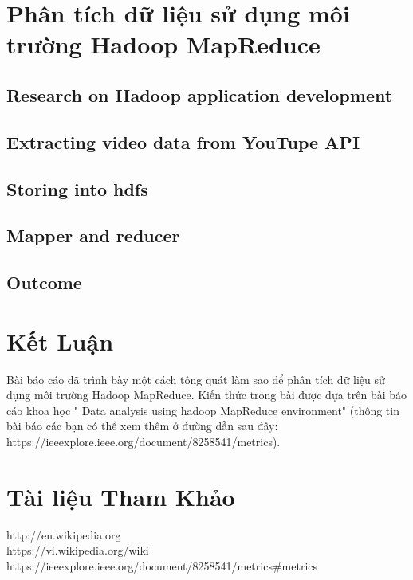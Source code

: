 \documentclass{hcmutarticle}
\begin{document}
\section{Phân tích dữ liệu sử dụng môi trường Hadoop MapReduce\\}

\subsection{Research on Hadoop application development}
\subsection{Extracting video data from YouTupe API}
\subsection{Storing into hdfs}
\subsection{Mapper and reducer}
\subsection{Outcome}






\section{Kết Luận }\label{result}
Bài báo cáo đã trình bày một cách tông quát làm sao để phân tích dữ liệu sử dụng môi trường Hadoop MapReduce. Kiến thức trong bài được dựa trên bài báo cáo khoa học " Data analysis using hadoop MapReduce environment" (thông tin bài báo các bạn có thể xem thêm ở đường dẫn sau đây: https://ieeexplore.ieee.org/document/8258541/metrics).

\section{Tài liệu Tham Khảo }
http://en.wikipedia.org\\
https://vi.wikipedia.org/wiki\\
https://ieeexplore.ieee.org/document/8258541/metrics\#metrics\\

\end{document}
